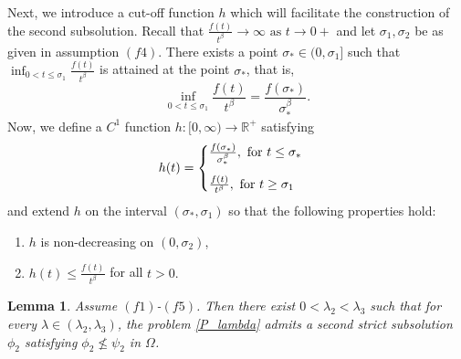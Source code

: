 \documentclass[reqno,oneside]{amsart}
\newtheorem{lemma}[theorem]{Lemma}
\theoremstyle{definition}
\theoremstyle{remark}
\numberwithin{equation}{section}
\newcommand{\la} {\lambda}
\newcommand{\ba}{\beta}
\newcommand{\Om} {\Omega}
\newcommand{\sr}{\mathbb{R}}
\newcommand{\si}{\sigma}
\newcommand{\rar}{\rightarrow}
\begin{document}
Next, we introduce a cut-off function $h$ which will facilitate the construction of the second subsolution. Recall that $\frac{f(t)}{t^{\ba}} \rar \infty \text{ as } t\rar 0+$ and let $\sigma_1,\sigma_2$ be as given in assumption $(f4).$ There exists a point $\si_* \in (0, \si_1]$ such that $\inf_{0<t\leq \si_1} \frac{f(t)}{t^{\ba}}$ is attained at the point $\si_*$, that is,
$$\inf_{0<t\leq \si_1} \frac{f(t)}{t^{\ba}} = \frac{f(\sigma_*)}{\sigma_*^{\ba}}.$$
Now, we define a $C^1$ function $h: [0,\infty) \rar \sr^+$ satisfying
\begin{equation}
    h(t)=\begin{cases}
        \frac{f(\si_*)}{\si_*^{\ba}}, \text{ for } t\leq \si_* \vspace{3mm}\\
        \frac{f(t)}{t^{\ba}}, \text{ for } t\geq \si_1
        \end{cases}
\end{equation}
and extend $h$ on the interval $(\si_*, \si_1)$ so that the following properties hold:
\begin{enumerate}
    \item[$(h1)$] $h$ is non-decreasing on $(0,\si_2)$,
    
    \item[$(h2)$] $h(t)\leq \frac{f(t)}{t^{\ba}}$ for all $t> 0.$
\end{enumerate}

\begin{lemma}\label{second_subsolution}
    Assume $(f1)$-$(f5)$. Then there exist $0<\la_2 <\la_3$ such that for every $\la\in (\la_2, \la_3)$, the problem \eqref{P_lambda} admits a second strict subsolution $\phi_2$ satisfying $\phi_2 \not\leq \psi_2$ in $\Om$.
\end{lemma}
\end{document}
